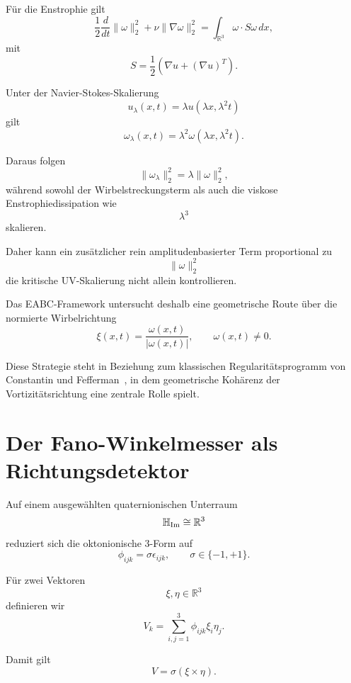 \documentclass[11pt,twoside,a4paper]{article}
\begin{document}
	Für die Enstrophie gilt
	\begin{equation}
		\frac{1}{2}\frac{d}{dt}\|\omega\|_2^2
		+
		\nu\|\nabla\omega\|_2^2
		=
		\int_{\mathbb{R}^3}
		\omega\cdot S\omega\,dx,
	\end{equation}
	mit
	\[
	S=\frac{1}{2}
	\left(
	\nabla u+(\nabla u)^T
	\right).
	\]
	
	Unter der Navier-Stokes-Skalierung
	\[
	u_\lambda(x,t)
	=
	\lambda u(\lambda x,\lambda^2t)
	\]
	gilt
	\[
	\omega_\lambda(x,t)
	=
	\lambda^2\omega(\lambda x,\lambda^2t).
	\]
	
	Daraus folgen
	\[
	\|\omega_\lambda\|_2^2
	=
	\lambda\|\omega\|_2^2,
	\]
	während sowohl der Wirbelstreckungsterm als auch die viskose Enstrophiedissipation wie
	\[
	\lambda^3
	\]
	skalieren.
	
	Daher kann ein zusätzlicher rein amplitudenbasierter Term proportional zu
	\[
	\|\omega\|_2^2
	\]
	die kritische UV-Skalierung nicht allein kontrollieren.
	
	Das EABC-Framework untersucht deshalb eine geometrische Route über die normierte Wirbelrichtung
	\begin{equation}
		\xi(x,t)
		=
		\frac{\omega(x,t)}{|\omega(x,t)|},
		\qquad
		\omega(x,t)\neq0.
	\end{equation}
	
	Diese Strategie steht in Beziehung zum klassischen Regularitätsprogramm von Constantin und Fefferman~\cite{constantin1993}, in dem geometrische Kohärenz der Vortizitätsrichtung eine zentrale Rolle spielt.
	
	\section{Der Fano-Winkelmesser als Richtungsdetektor}
	
	Auf einem ausgewählten quaternionischen Unterraum
	\[
	\mathbb{H}_{\rm Im}\cong\mathbb{R}^3
	\]
	reduziert sich die oktonionische 3-Form auf
	\begin{equation}
		\phi_{ijk}
		=
		\sigma\epsilon_{ijk},
		\qquad
		\sigma\in\{-1,+1\}.
	\end{equation}
	
	Für zwei Vektoren
	\[
	\xi,\eta\in\mathbb{R}^3
	\]
	definieren wir
	\begin{equation}
		V_k
		=
		\sum_{i,j=1}^3
		\phi_{ijk}\xi_i\eta_j.
	\end{equation}
	
	Damit gilt
	\begin{equation}
		V
		=
		\sigma(\xi\times\eta).
	\end{equation}
	
\end{document}
